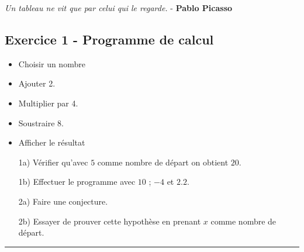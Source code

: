 \documentclass[12pt]{article}
\newcommand{\horrule}[1]{\rule{\linewidth}{#1}} %
\begin{document}

\begin{center}
  \textit{Un tableau ne vit que par celui qui le regarde.} - \textbf{Pablo Picasso}
\end{center}

\setlength{\columnseprule}{1pt}

\begin{multicols}{2}

  \subsection*{Exercice 1 - Programme de calcul}

  \begin{itemize}
  \item Choisir un nombre
  \item Ajouter 2.
  \item Multiplier par 4.
  \item Soustraire 8.
  \item Afficher le résultat
  \end{itemize}

  \begin{enumerate}
  \item[1a)] Vérifier qu'avec $5$ comme nombre de départ on obtient $20$.
  \item[1b)] Effectuer le programme avec $10$ ; $-4$ et $2.2$.
  \item[2a)] Faire une conjecture.
  \item[2b)] Essayer de prouver cette hypothèse en prenant $x$ comme nombre de départ.
  \end{enumerate}

\end{multicols}

\horrule{1px}
\end{document}
